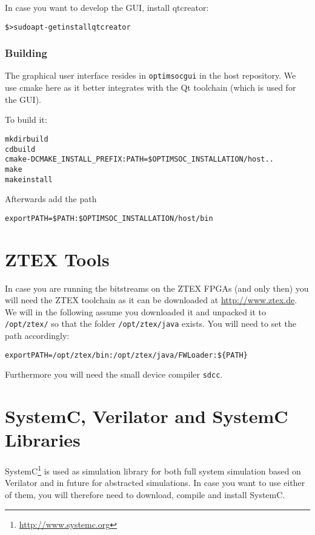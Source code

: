 In case you want to develop the GUI, install qtcreator:

\begin{alltt}
\$> sudo apt-get install qtcreator
\end{alltt}

\subsubsection{Building}

The graphical user interface resides in \verb|optimsocgui| in the host
repository. We use cmake here as it better integrates with the Qt
toolchain (which is used for the GUI).

To build it:

\begin{alltt}
mkdir build
cd build
cmake -DCMAKE_INSTALL_PREFIX:PATH=\$OPTIMSOC_INSTALLATION/host ..
make
make install
\end{alltt}

Afterwards add the path

\begin{alltt}
export PATH=\$PATH:\$OPTIMSOC_INSTALLATION/host/bin
\end{alltt}

\section{ZTEX Tools}

In case you are running the bitstreams on the ZTEX FPGAs (and only
then) you will need the ZTEX toolchain as it can be downloaded at
\url{http://www.ztex.de}. We will in the following assume you
downloaded it and unpacked it to \verb|/opt/ztex/| so that the folder
\verb|/opt/ztex/java| exists. You will need to set the path
accordingly:

\begin{alltt}
export PATH=/opt/ztex/bin:/opt/ztex/java/FWLoader:\$\{PATH\}
\end{alltt}

Furthermore you will need the small device compiler \verb|sdcc|.

\section{SystemC, Verilator and SystemC Libraries}

SystemC\footnote{\url{http://www.systemc.org}} is used as simulation
library for both full system simulation based on Verilator and in
future for abstracted simulations. In case you want to use either of
them, you will therefore need to download, compile and install
SystemC.

